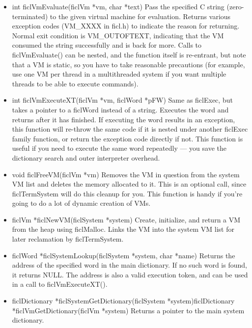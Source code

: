 \begin{itemize}[noitemsep]
	\item int ficlVmEvaluate(ficlVm *vm, char *text)\newline
	Pass the specified C string (zero-terminated) to the given
	virtual machine for evaluation. Returns various exception codes
	(VM\_XXXX in ficl.h) to indicate the reason for returning.
	Normal exit condition is VM\_OUTOFTEXT, indicating that the VM
	consumed the string successfully and is back for more. Calls to
	ficlVmEvaluate() can be nested, and the function itself is
	re-entrant, but note that a VM is static, so you have to take
	reasonable precautions (for example, use one VM per thread in a
	multithreaded system if you want multiple threads to be able to
	execute commands).

	\item int ficlVmExecuteXT(ficlVm *vm, ficlWord *pFW)\newline
	Same as ficlExec, but takes a pointer to a ficlWord instead of
	a string. Executes the word and returns after it has finished.
	If executing the word results in an exception, this function
	will re-throw the same code if it is nested under another
	ficlExec family function, or return the exception code directly
	if not. This function is useful if you need to execute the same
	word repeatedly — you save the dictionary search and outer
	interpreter overhead.

	\item void ficlFreeVM(ficlVm *vm)\newline
	Removes the VM in question from the system VM list and deletes
	the memory allocated to it. This is an optional call, since
	ficlTermSystem will do this cleanup for you. This function is
	handy if you're going to do a lot of dynamic creation of VMs.

	\item ficlVm *ficlNewVM(ficlSystem *system)\newline
	Create, initialize, and return a VM from the heap using
	ficlMalloc. Links the VM into the system VM list for later
	reclamation by ficlTermSystem.

	\item ficlWord *ficlSystemLookup(ficlSystem *system, char
		*name)\newline
	Returns the address of the specified word in the main
	dictionary. If no such word is found, it returns NULL. The
	address is also a valid execution token, and can be used in a
	call to ficlVmExecuteXT().

	\item ficlDictionary *ficlSystemGetDictionary(ficlSystem
		*system)\newline ficlDictionary
		*ficlVmGetDictionary(ficlVm *system)\newline
	Returns a pointer to the main system dictionary.


\end{itemize}
